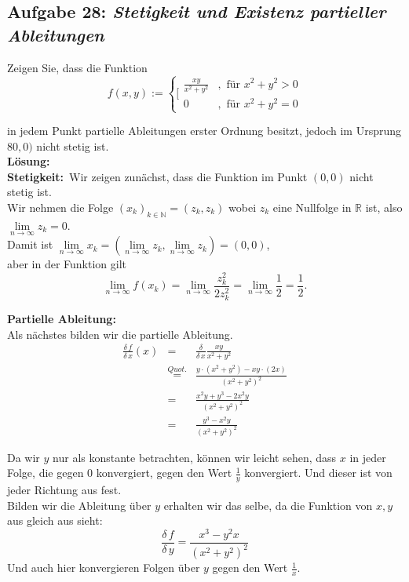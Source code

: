 \subsection*{Aufgabe 28: \mdseries\itshape Stetigkeit und Existenz partieller Ableitungen}

Zeigen Sie, dass die Funktion
$$
	f(x,y) := \left\{[ \begin{array}{lr}
		\frac{xy}{x^2+y^2} &, \text{ für } x^2+y^2 > 0\\
		0&, \text{ für } x^2+y^2=0
	\end{array} \right.
$$

in jedem Punkt partielle Ableitungen erster Ordnung besitzt, jedoch im Ursprung $80,0)$ nicht stetig ist.\\

\textbf{Lösung:}\\

\textbf{Stetigkeit:}\
Wir zeigen zunächst, dass die Funktion im Punkt $(0,0)$ nicht stetig ist.\\

Wir nehmen die Folge $(x_k)_{k\in\mathbb{N}} = (z_k,z_k)$ wobei $z_k$ eine Nullfolge in $\mathbb{R}$ ist, also
$\underset{n \rightarrow \infty}{\lim} z_k = 0$.\\

Damit ist $\underset{n \rightarrow \infty}{\lim} x_k = (\underset{n \rightarrow \infty}{\lim} z_k, \underset{n \rightarrow \infty}{\lim} z_k) = (0,0)$,\\
aber in der Funktion gilt
$$
\underset{n \rightarrow \infty}{\lim} f(x_k) = \underset{n \rightarrow \infty}{\lim} \frac{z_k^2}{2z_k^2} = \underset{n \rightarrow \infty}{\lim} \frac{1}{2} = \frac{1}{2}.
$$

\textbf{Partielle Ableitung:}\\
Als nächstes bilden wir die partielle Ableitung.\\

$$\begin{array}{rcl}
	\frac{\delta \, f}{\delta \, x} (x) &=& \frac{\delta}{\delta \, x} \frac{xy}{x^2+y^2}\\
		&\stackrel{Quot.}{=}& \frac{y \cdot (x^2+y^2) - xy \cdot (2x)}{(x^2+y^2)^2}\\
		&=& \frac{x^2y + y^3 - 2x^2y}{(x^2+y^2)^2}\\
		&=& \frac{y^3 - x^2y}{(x^2+y^2)^2}
\end{array}$$

Da wir $y$ nur als konstante betrachten, können wir leicht sehen, dass $x$ in jeder Folge, die gegen 0 konvergiert, gegen den Wert
$\frac{1}{y}$ konvergiert. Und dieser ist von jeder Richtung aus fest.\\

Bilden wir die Ableitung über $y$ erhalten wir das selbe, da die Funktion von $x,y$ aus gleich aus sieht:\\
$$
\frac{\delta \, f}{\delta \, y} = \frac{x^3 - y^2x}{(x^2 + y^2)^2}
$$
Und auch hier konvergieren Folgen über $y$ gegen den Wert $\frac{1}{x}$.


